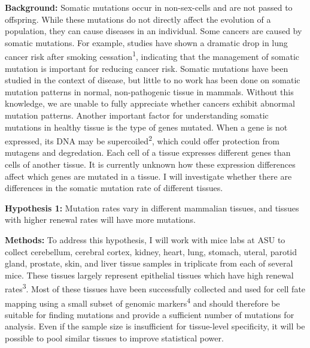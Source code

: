 \documentclass[12pt]{article}
\begin{document}
\noindent
\textbf{Background:}
Somatic mutations occur in non-sex-cells and are not passed to offspring. While these mutations do not directly affect the evolution of a population, they can cause diseases in an individual. Some cancers are caused by somatic mutations. For example, studies have shown a dramatic drop in lung cancer risk after smoking cessation\textsuperscript{1}, indicating that the management of somatic mutation is important for reducing cancer risk. %
Somatic mutations have been studied in the context of disease, but little to no work has been done on somatic mutation patterns in normal, non-pathogenic tissue in mammals. Without this knowledge, we are unable to fully appreciate whether cancers exhibit abnormal mutation patterns.
Another important factor for understanding somatic mutations in healthy tissue is the type of genes mutated. When a gene is not expressed, its DNA may be supercoiled\textsuperscript{2}, which could offer protection from mutagens and degredation. Each cell of a tissue expresses different genes than cells of another tissue. It is currently unknown how these expression differences affect which genes are mutated in a tissue. I will investigate whether there are differences in the somatic mutation rate of different tissues. 

\textbf{Hypothesis 1:}
Mutation rates vary in different mammalian tissues, and tissues with higher %
renewal rates will have more mutations.

\textbf{Methods:}
To address this hypothesis, I will work with mice labs at ASU to collect cerebellum, cerebral cortex, kidney, heart, lung, stomach, uteral, parotid gland, prostate, skin, and liver tissue samples in triplicate from each of several mice. These tissues largely represent epithelial tissues which have high renewal rates\textsuperscript{3}. %
Most of these tissues have been successfully collected and used for cell fate mapping using a small subset of genomic markers\textsuperscript{4} and should therefore be suitable for finding mutations and provide a sufficient number of mutations for analysis. Even if the sample size is insufficient for tissue-level specificity, it will be possible to pool similar tissues to improve statistical power.
\end{document}
